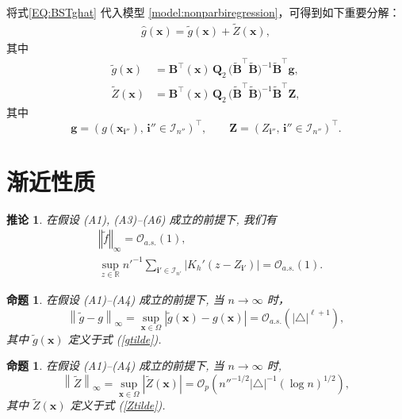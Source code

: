 \documentclass[a4paper,openay,14pt]{ctexbook}
\numberwithin{equation}{section}
\numberwithin{lem}{section}
\newtheorem{pro}[theorem]{命题}
\newtheorem{coro}[theorem]{推论}%
\begin{document}
将式\eqref{EQ:BSTghat} 代入模型 \eqref{model:nonparbiregression}，可得到如下重要分解：
\begin{align}\label{EQ:ghat}
  \hat{g}(\boldsymbol{x})
  = \tilde{g}(\boldsymbol{x}) + \tilde{Z}(\boldsymbol{x}),
\end{align}
其中
\begin{align}\label{gtilde}
  \tilde{g}(\boldsymbol{x})
  &= \mathbf{B}^\top(\boldsymbol{x})\,\mathbf{Q}_2\,
     \bigl(\tilde{\mathbf{B}}^\top \tilde{\mathbf{B}}\bigr)^{-1}
     \tilde{\mathbf{B}}^\top \mathbf{g},\\[0.4em]
\label{Ztilde}
  \tilde{Z}(\boldsymbol{x})
  &= \mathbf{B}^\top(\boldsymbol{x})\,\mathbf{Q}_2\,
     \bigl(\tilde{\mathbf{B}}^\top \tilde{\mathbf{B}} \bigr)^{-1}
     \tilde{\mathbf{B}}^\top \mathbf{Z},
\end{align}
其中
\[
\mathbf{g}
=(g(\boldsymbol{x}_{\mathbf{i}''}),\,\mathbf{i}''\in \mathcal{I}_{n''})^{\top},
\qquad
\mathbf{Z}
=(Z_{\mathbf{i}''},\,\mathbf{i}''\in \mathcal{I}_{n''})^{\top}.
\]



\section{渐近性质}

\begin{coro}\label{colrollary:ftilde}
在假设 (A1), (A3)–(A6) 成立的前提下, 我们有
\begin{align*}
    &\left\Vert \tilde{f} \right\Vert_{\infty} = \mathcal{O}_{a.s.}(1),
    \\ 
    &\sup_{z\in\mathbb{R}} n'^{-1}\sum_{\mathbf{i}'\in\mathcal{I}_{n'}} 
    \left\vert K_h'(z-Z_{\mathbf{i}'}) \right\vert = \mathcal{O}_{a.s.}(1).
\end{align*}
\end{coro}

\begin{pro}\label{Prop:diffierence of mean function}
在假设 (A1)–(A4) 成立的前提下, 当 $n \to \infty$ 时，
\[
\left\lVert \tilde{g} - g \right\rVert_{\infty}
= \sup_{\boldsymbol{x} \in \Omega} \left| \tilde{g}(\boldsymbol{x}) - g(\boldsymbol{x}) \right|
= \mathcal{O}_{a.s.} \left( |\triangle|^{\ell+1} \right),
\]
其中 $\tilde{g}(\boldsymbol{x})$ 定义于式 (\ref{gtilde}).
\end{pro}

\begin{pro} \label{Prop:order of error Z}
在假设 (A1)–(A4) 成立的前提下, 当 $n \to \infty$ 时,
\[
\left\lVert \tilde{Z} \right\rVert_{\infty}
= \sup_{\boldsymbol{x} \in \Omega} \left| \tilde{Z}(\boldsymbol{x}) \right|
= \mathcal{O}_p \left( n''^{-1/2} |\triangle|^{-1} (\log n)^{1/2} \right),
\]
其中 $\tilde{Z}(\boldsymbol{x})$ 定义于式 (\ref{Ztilde}).
\end{pro}
\end{document}
